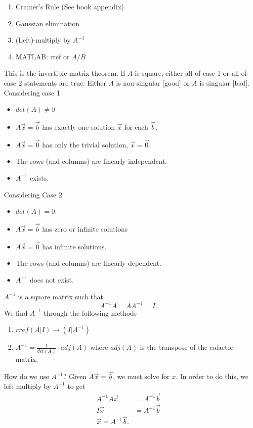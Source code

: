 \begin{enumerate}
  \item Cramer's Rule (See book appendix)
  \item Gaussian elimination
  \item (Left)-multiply by $A^{-1}$
  \item MATLAB: rref or $A / B$
\end{enumerate}

\begin{theorem}
  This is the invertible matrix theorem. If $A$ is square, either all of case 1 or all of case 2 statements are true. Either $A$ is non-singular [good] or $A$ is singular [bad]. \newline Considering case 1
  \begin{itemize}
    \item $det(A)\neq 0$
    \item $A\vec{x}=\vec{b}$ has exactly one solution $\vec{x}$ for each $\vec{b}$.
    \item $A\vec{x}=\vec{0}$ has only the trivial solution, $\vec{x}=\vec{0}$.
    \item The rows (and columns) are linearly independent.
    \item $A^{-1}$ exists.
  \end{itemize}
  Considering Case 2
  \begin{itemize}
    \item $det(A)=0$
    \item $A\vec{x}=\vec{b}$ has zero or infinite solutions
    \item $A\vec{x}=\vec{0}$ has infinite solutions.
    \item The rows (and columns) are linearly dependent.
    \item $A^{-1}$ does not exist.
  \end{itemize}
\end{theorem}
$A^{-1}$ is a square matrix such that \[
A^{-1}A=A A^{-1}=I
.\] We find $A^{-1}$ through the following methods
\begin{enumerate}
  \item $rref(A|I)\to(I|A^{-1})$
  \item $A^{-1}=\frac{1}{det(A)}\cdot adj(A)$ where $adj(A)$ is the transpose of the cofactor matrix.
\end{enumerate}
How do we use $A^{-1}$? Given $A\vec{x}=\vec{b}$, we must solve for $x$. In order to do this, we left multiply by $A^{-1}$ to get 
\begin{align*}
  A^{-1}A\vec{x}&=A^{-1}\vec{b}\\
  I\vec{x}&=A^{-1}\vec{b}\\
  \vec{x}=A^{-1}\vec{b}
.\end{align*}

